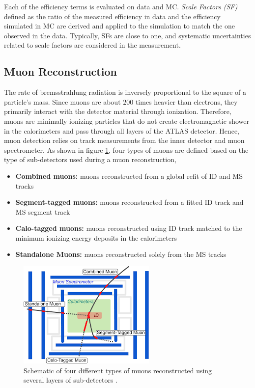 Each of the efficiency terms is evaluated on data and MC. \textit{Scale Factors (SF)} defined as the ratio of the measured efficiency in data and the efficiency simulated in MC are derived and applied to the simulation to match the one observed in the data. Typically, SFs are close to one, and systematic uncertainties related to scale factors are considered in the measurement.

\subsection{Muon Reconstruction}
\label{subsec:ParticleRecon_Muon}
The rate of bremsstrahlung radiation is inversely proportional to the square of a particle's mass. Since muons are about $200$ times heavier than electrons, they primarily interact with the detector material through ionization. Therefore, muons are minimally ionizing particles that do not create electromagnetic shower in the calorimeters and pass through all layers of the ATLAS detector. Hence, muon detection relies on track measurements from the inner detector and muon spectrometer. As shown in figure \ref{fig:MuonFig}, four types of muons are defined based on the type of sub-detectors used during a muon reconstruction,

\begin{itemize}
    \item{\textbf{Combined muons:} muons reconstructed from a global refit of ID and MS tracks }
    \item{\textbf{Segment-tagged muons:} muons reconstructed from a fitted ID track and MS segment track } 
    \item{\textbf{Calo-tagged muons:}  muons reconstructed using ID track matched to the minimum ionizing energy deposits in the calorimeters}
    \item{\textbf{Standalone Muons:} muons reconstructed solely from the MS tracks }
\end{itemize}

\begin{figure}
    \centering
    \includegraphics[width=.5\linewidth]{figures/LHC/MuonTypes.pdf}
    \caption{ Schematic of four different types of muons reconstructed using several layers of sub-detectors \cite{MuonReco}.\label{fig:MuonFig}}
\end{figure}

